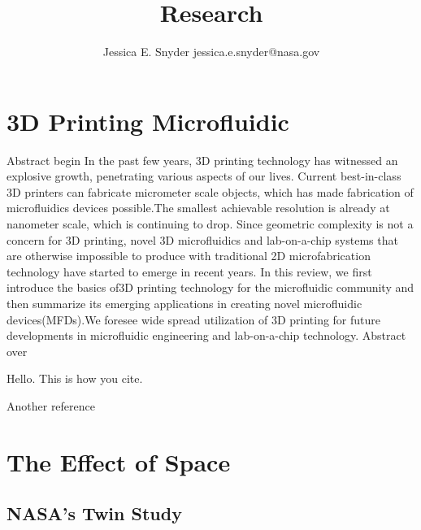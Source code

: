 \documentclass[a4paper, 11pt]{article}
\begin{document}
\author{Jessica E. Snyder jessica.e.snyder@nasa.gov}
\title{ Research}
\maketitle

\tableofcontents


\section{3D Printing Microfluidic}


Abstract begin 
In the past few years, 3D printing technology has witnessed an explosive growth, penetrating various aspects of our lives. Current best-in-class 3D printers can fabricate micrometer scale objects, which has made fabrication of microfluidics  devices  possible.The  smallest  achievable  resolution  is already  at  nanometer  scale,  which  is continuing to drop. Since geometric complexity is not a concern for 3D printing, novel 3D microfluidics and lab-on-a-chip systems that are otherwise impossible to produce with traditional 2D microfabrication technology have started to emerge in recent years. In this review, we first introduce the basics of3D printing technology for the microfluidic  community and then summarize  its  emerging  applications  in creating  novel microfluidic  devices(MFDs).We foresee  wide spread utilization of 3D printing for future developments in microfluidic engineering and lab-on-a-chip technology.
   \cite{yazdi20163d}
   Abstract over 
   
   Hello. This is how you cite. \cite{gustafsson2016best}
   
   Another reference \cite{hamid2015surface}
   
    \section{The Effect of Space}
    \subsection{NASA's Twin Study}
    
\end{document}
